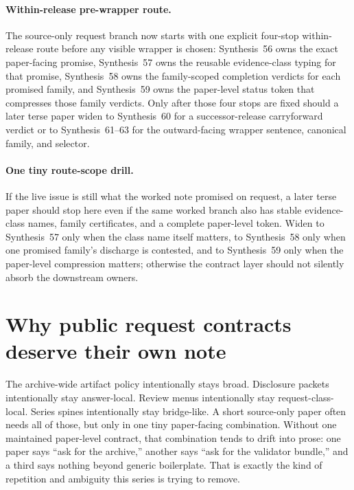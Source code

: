 \documentclass[11pt]{article}
\begin{document}
\paragraph{Within-release pre-wrapper route.}
The source-only request branch now starts with one explicit four-stop within-release route before any visible wrapper is chosen: Synthesis~56 owns the exact paper-facing promise, Synthesis~57 owns the reusable evidence-class typing for that promise, Synthesis~58 owns the family-scoped completion verdicts for each promised family, and Synthesis~59 owns the paper-level status token that compresses those family verdicts. Only after those four stops are fixed should a later terse paper widen to Synthesis~60 for a successor-release carryforward verdict or to Synthesis~61--63 for the outward-facing wrapper sentence, canonical family, and selector.\cite{series:requestableevidenceclasses,series:requestfulfillmentcertificates,series:publicrequeststatusenvelopes,series:publicrequestcarryforward,series:publicrequestnotices,series:publicrequestnoticenormalforms,series:publicrequestnoticeselections}

\paragraph{One tiny route-scope drill.}
If the live issue is still what the worked note promised on request, a later terse paper should stop here even if the same worked branch also has stable evidence-class names, family certificates, and a complete paper-level token. Widen to Synthesis~57 only when the class name itself matters, to Synthesis~58 only when one promised family's discharge is contested, and to Synthesis~59 only when the paper-level compression matters; otherwise the contract layer should not silently absorb the downstream owners.\cite{series:workedexample}

\section{Why public request contracts deserve their own note}
The archive-wide artifact policy intentionally stays broad.
Disclosure packets intentionally stay answer-local.
Review menus intentionally stay request-class-local.
Series spines intentionally stay bridge-like.
A short source-only paper often needs all of those, but only in one tiny paper-facing combination.
Without one maintained paper-level contract, that combination tends to drift into prose: one paper says ``ask for the archive,'' another says ``ask for the validator bundle,'' and a third says nothing beyond generic boilerplate.
That is exactly the kind of repetition and ambiguity this series is trying to remove.
\end{document}
